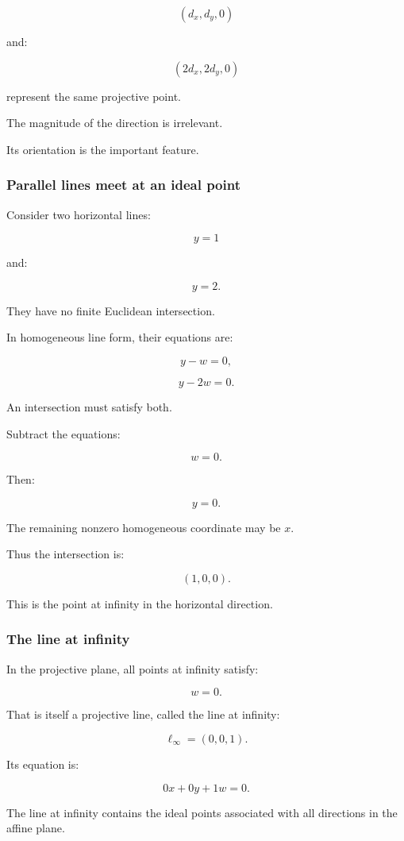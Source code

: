 \[
 (d_x,d_y,0)
\]

and:

\[
 (2d_x,2d_y,0)
\]

represent the same projective point.

The magnitude of the direction is irrelevant.

Its orientation is the important feature.

\subsubsection{Parallel lines meet at an ideal point}\label{parallel-lines-meet-at-an-ideal-point}

Consider two horizontal lines:

\[
 y=1
\]

and:

\[
 y=2.
\]

They have no finite Euclidean intersection.

In homogeneous line form, their equations are:

\[
 y-w=0,
\]

\[
 y-2w=0.
\]

An intersection must satisfy both.

Subtract the equations:

\[
 w=0.
\]

Then:

\[
 y=0.
\]

The remaining nonzero homogeneous coordinate may be \(x\).

Thus the intersection is:

\[
 \boxed{ (1,0,0) }.
\]

This is the point at infinity in the horizontal direction.

\subsubsection{The line at infinity}\label{the-line-at-infinity}

In the projective plane, all points at infinity satisfy:

\[
 w=0.
\]

That is itself a projective line, called the line at infinity:

\[
 \boxed{ \ell_\infty=(0,0,1) }.
\]

Its equation is:

\[
 0x+0y+1w=0.
\]

The line at infinity contains the ideal points associated with all directions in the affine plane.

